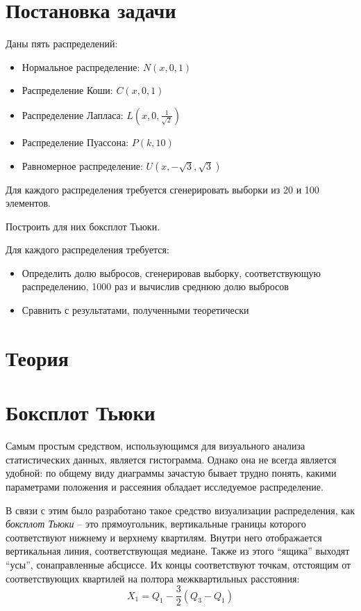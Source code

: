 \section{Постановка задачи}
Даны пять распределений:
\begin{itemize}
\item Нормальное распределение: $N(x, 0, 1)$
\item Распределение Коши: $C(x, 0, 1)$
\item Распределение Лапласа: $L(x, 0, \frac{1}{\sqrt{2}})$
\item Распределение Пуассона: $P(k, 10)$
\item Равномерное распределение: $U(x, -\sqrt{3}, \sqrt{3})$
\end{itemize}

Для каждого распределения требуется сгенерировать выборки из 20 и 100 элементов.

Построить для них боксплот Тьюки.

Для каждого распределения требуется:
\begin{itemize}
	\item Определить долю выбросов, сгенерировав выборку, соответствующую распределению, 1000 раз и вычислив среднюю долю выбросов
	\item Сравнить с результатами, полученными теоретически
\end{itemize}

\section{Теория}

\section{Боксплот Тьюки}
Самым простым средством, использующимся для визуального анализа статистических данных, является гистограмма. Однако она не всегда является удобной: по общему виду диаграммы зачастую бывает трудно понять, какими параметрами положения и рассеяния обладает исследуемое распределение.

В связи с этим было разработано такое средство визуализации распределения, как \textit{боксплот Тьюки} -- это прямоугольник, вертикальные границы которого соответствуют нижнему и верхнему квартилям. Внутри него отображается вертикальная линия, соответствующая медиане. Также из этого ``ящика'' выходят ``усы'', сонаправленные абсциссе. Их концы соответствуют точкам, отстоящим от соответствующих квартилей на полтора межквартильных расстояния:
\begin{equation}
	X_1 = Q_1 - \frac{3}{2}(Q_3-Q_1)
\end{equation}

